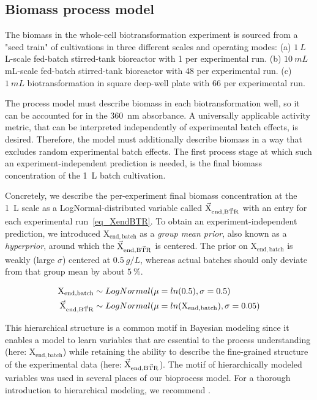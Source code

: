 \documentclass[sn-standardnature]{sn-jnl}%
\def\vec{\mathaccent "017E\relax }
\theoremstyle{thmstyleone}%
\theoremstyle{thmstyletwo}%
\theoremstyle{thmstylethree}%
\begin{document}
\subsection{Biomass process model}
\label{sec_biomass_model}

The biomass in the whole-cell biotransformation experiment is sourced from a "seed train" of cultivations in three different scales and operating modes:
(a) $1\ L$ L-scale fed-batch stirred-tank bioreactor with 1 per experimental run.
(b) $10\ mL$ mL-scale fed-batch stirred-tank bioreactor with 48 per experimental run.
(c) $1\ mL$ biotransformation in square deep-well plate with 66 per experimental run.

The process model must describe biomass in each biotransformation well, so it can be accounted for in the 360~nm absorbance.
A universally applicable activity metric, that can be interpreted independently of experimental batch effects, is desired.
Therefore, the model must additionally describe biomass in a way that excludes random experimental batch effects.
The first process stage at which such an experiment-independent prediction is needed, is the final biomass concentration of the 1~L batch cultivation.

Concretely, we describe the per-experiment final biomass concentration at the 1~L scale as a LogNormal-distributed variable called $\mathrm{\vec{X}_{end,\vec{BTR}}}$ with an entry for each experimental run~\eqref{eq_XendBTR}.
To obtain an experiment-independent prediction, we introduced $\mathrm{X_{end,batch}}$ as a \textit{group mean prior}, also known as a \textit{hyperprior}, around which the $\mathrm{\vec{X}_{end,\vec{BTR}}}$ is centered.
The prior on $\mathrm{X_{end,batch}}$ is weakly (large $\sigma$) centered at $0.5\ g/L$, whereas actual batches should only deviate from that group mean by about $5\ \%$.

\begin{equation}
\begin{aligned}
    \mathrm{X_{end,batch}} &\sim LogNormal(\mu=ln(0.5), \sigma=0.5)\\
    \mathrm{\vec{X}_{end,\vec{BTR}}} &\sim LogNormal(\mu=ln(\mathrm{X_{end,batch}}), \sigma=0.05)
\end{aligned}
\label{eq_XendBTR}
\end{equation}

This hierarchical structure is a common motif in Bayesian modeling since it enables a model to learn variables that are essential to the process understanding (here: $\mathrm{X_{end,batch}}$) while retaining the ability to describe the fine-grained structure of the experimental data (here: $\mathrm{\vec{X}_{end,\vec{BTR}}}$).
The motif of hierarchically modeled variables was used in several places of our bioprocess model.
For a thorough introduction to hierarchical modeling, we recommend \cite{betancourt2020}.
\end{document}
